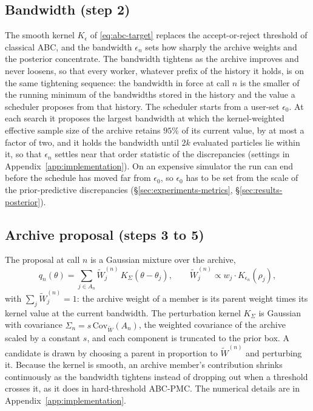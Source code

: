 \documentclass[10pt]{article}
\theoremstyle{plain}
\theoremstyle{definition}
\begin{document}
\subsection{Bandwidth (step 2)}\label{sec:method-tolerance}
The smooth kernel $K_\epsilon$ of \eqref{eq:abc-target} replaces the accept-or-reject threshold of classical ABC, and the bandwidth $\epsilon_n$ sets how sharply the archive weights and the posterior concentrate. The bandwidth tightens as the archive improves and never loosens, so that every worker, whatever prefix of the history it holds, is on the same tightening sequence: the bandwidth in force at call $n$ is the smaller of the running minimum of the bandwidths stored in the history and the value a scheduler proposes from that history. The scheduler starts from a user-set $\epsilon_0$. At each search it proposes the largest bandwidth at which the kernel-weighted effective sample size of the archive retains $95\%$ of its current value, by at most a factor of two, and it holds the bandwidth until $2k$ evaluated particles lie within it, so that $\epsilon_n$ settles near that order statistic of the discrepancies (settings in Appendix~\ref{app:implementation}). On an expensive simulator the run can end before the schedule has moved far from $\epsilon_0$, so $\epsilon_0$ has to be set from the scale of the prior-predictive discrepancies (\S\ref{sec:experiments-metrics}, \S\ref{sec:results-posterior}).

\subsection{Archive proposal (steps 3 to 5)}\label{sec:method-proposal}
The proposal at call $n$ is a Gaussian mixture over the archive,
\begin{equation}
q_n(\theta) = \sum_{j\in A_n}\tilde W_j^{(n)}\, K_\Sigma(\theta-\theta_j),
\qquad
\tilde W_j^{(n)} \propto w_j \cdot K_{\epsilon_n}(\rho_j),
\label{eq:steady-state-proposal}
\end{equation}
with $\sum_j \tilde W_j^{(n)}=1$: the archive weight of a member is its parent weight times its kernel value at the current bandwidth. The perturbation kernel $K_\Sigma$ is Gaussian with covariance $\Sigma_n = s\,\widehat{\mathrm{Cov}}_{\tilde W}(A_n)$, the weighted covariance of the archive scaled by a constant $s$, and each component is truncated to the prior box. A candidate is drawn by choosing a parent in proportion to $\tilde W^{(n)}$ and perturbing it. Because the kernel is smooth, an archive member's contribution shrinks continuously as the bandwidth tightens instead of dropping out when a threshold crosses it, as it does in hard-threshold ABC-PMC. The numerical details are in Appendix~\ref{app:implementation}.
\end{document}
